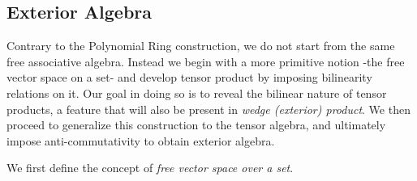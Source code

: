 \documentclass[12pt]{article}
\numberwithin{theorem}{section}
\numberwithin{equation}{theorem}
\begin{document}
\subsection{Exterior Algebra}
Contrary to the Polynomial Ring construction, we do not start from the same free associative algebra. Instead we begin with a more primitive notion -the free vector space on a set- and develop tensor product by imposing bilinearity relations on it. Our goal in doing so is to reveal the bilinear nature of tensor products, a feature that will also be present in \emph{wedge (exterior) product}. We then proceed to generalize this construction to the tensor algebra, and ultimately impose anti-commutativity to obtain exterior algebra.

\begin{center}
\begin{minipage}{\textwidth}
\centering
{}
\end{minipage}
\end{center}

We first define the concept of \emph{free vector space over a set}.
\end{document}
